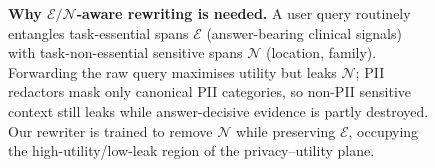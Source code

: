 \begin{figure}[t]
\begin{tikzpicture}
\end{tikzpicture}

\caption{\textbf{Why $\mathcal{E}/\mathcal{N}$-aware rewriting is needed.}
A user query routinely entangles \textcolor{\colE}{task-essential spans
$\mathcal{E}$} (answer-bearing clinical signals) with
\textcolor{\colN}{task-non-essential sensitive spans $\mathcal{N}$}
(location, family). Forwarding the raw query maximises utility but
leaks $\mathcal{N}$; PII redactors mask only canonical PII categories,
so non-PII sensitive context still leaks while answer-decisive
evidence is partly destroyed. Our rewriter is trained to remove
$\mathcal{N}$ while preserving $\mathcal{E}$, occupying the
high-utility/low-leak region of the privacy--utility plane.}
\label{fig:teaser}
\end{figure}

